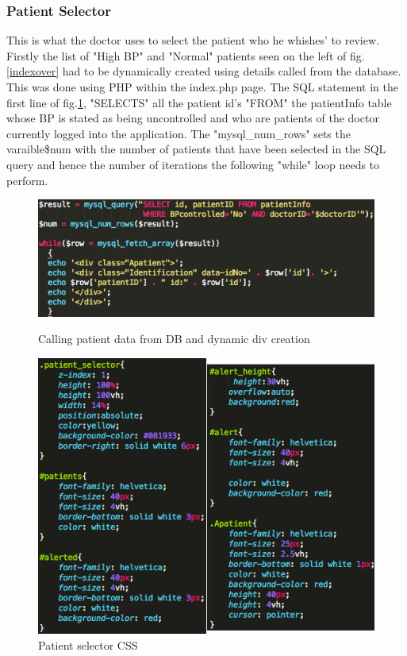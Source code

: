 \documentclass[11pt]{article}
\begin{document}
\subsubsection{Patient Selector} 
This is what the doctor uses to select the patient who he whishes' to review. Firstly the list of "High BP" and "Normal" patients seen on the left of fig.\ref{indexover} had to be dynamically created using details called from the database. This was done using PHP within the index.php page. The SQL statement in the first line of fig.\ref{selectorphp}, "SELECTS" all the patient id's "FROM" the patientInfo table whose BP is stated as being uncontrolled and who are patients of the doctor currently logged into the application. The "mysql\_num\_rows" sets the varaible\$num with the number of patients that have been selected in the SQL query and hence the number of iterations the following "while" loop needs to perform. 
\begin{figure}[h!] 
\includegraphics[width=\linewidth]{selectorphp.png}
\caption{Calling patient data from DB and dynamic div creation \label{selectorphp}}
\endminipage\hfill
{}
\includegraphics[width=\linewidth]{selectorCSS.png}
\caption{Patient selector CSS}
\endminipage
\end{figure} 
\end{document}
